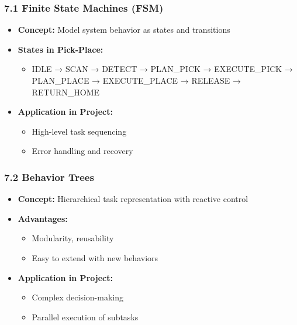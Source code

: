 \documentclass[
]{article}
\providecommand{\tightlist}{%
  \setlength{\itemsep}{0pt}\setlength{\parskip}{0pt}}
\begin{document}
\hypertarget{finite-state-machines-fsm}{%
\subsubsection{7.1 Finite State Machines
(FSM)}\label{finite-state-machines-fsm}}

\begin{itemize}
\tightlist
\item
  \textbf{Concept:} Model system behavior as states and transitions
\item
  \textbf{States in Pick-Place:}

  \begin{itemize}
  \tightlist
  \item
    IDLE → SCAN → DETECT → PLAN\_PICK → EXECUTE\_PICK → PLAN\_PLACE →
    EXECUTE\_PLACE → RELEASE → RETURN\_HOME
  \end{itemize}
\item
  \textbf{Application in Project:}

  \begin{itemize}
  \tightlist
  \item
    High-level task sequencing
  \item
    Error handling and recovery
  \end{itemize}
\end{itemize}

\hypertarget{behavior-trees}{%
\subsubsection{7.2 Behavior Trees}\label{behavior-trees}}

\begin{itemize}
\tightlist
\item
  \textbf{Concept:} Hierarchical task representation with reactive
  control
\item
  \textbf{Advantages:}

  \begin{itemize}
  \tightlist
  \item
    Modularity, reusability
  \item
    Easy to extend with new behaviors
  \end{itemize}
\item
  \textbf{Application in Project:}

  \begin{itemize}
  \tightlist
  \item
    Complex decision-making
  \item
    Parallel execution of subtasks
  \end{itemize}
\end{itemize}
\end{document}
